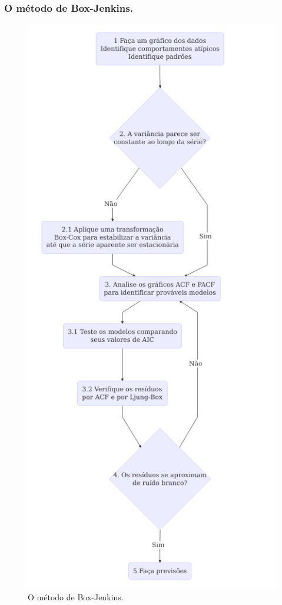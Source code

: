 \documentclass{beamer}
\begin{document}
\begin{frame}
	\frametitle{O método de Box-Jenkins.}
	\begin{figure}
		\centering
		\includegraphics[width=\textwidth]{boxjenkins}
		\caption{O método de Box-Jenkins.}
	\end{figure}
\end{frame}
\end{document}
